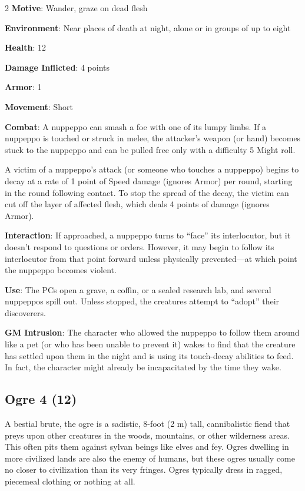 \begin{multicols}{2}
\textbf{Motive}: Wander, graze on dead flesh

\textbf{Environment}: Near places of death at night, alone or in groups of up to eight 

\textbf{Health}: 12

\textbf{Damage Inflicted}: 4 points

\textbf{Armor}: 1

\textbf{Movement}: Short

\textbf{Combat}: A nuppeppo can smash a foe with one of its lumpy limbs. If a nuppeppo is touched or struck in melee, the attacker’s weapon (or hand) becomes stuck to the nuppeppo and can be pulled free only with a difficulty 5 Might roll.

A victim of a nuppeppo’s attack (or someone who touches a nuppeppo) begins to decay at a rate of 1 point of Speed damage (ignores Armor) per round, starting in the round following contact. To stop the spread of the decay, the victim can cut off the layer of affected flesh, which deals 4 points of damage (ignores Armor).

\textbf{Interaction}: If approached, a nuppeppo turns to “face” its interlocutor, but it doesn’t respond to questions or orders. However, it may begin to follow its interlocutor from that point forward unless physically prevented—at which point the nuppeppo becomes violent.

\textbf{Use}: The PCs open a grave, a coffin, or a sealed research lab, and several nuppeppos spill out. Unless stopped, the creatures attempt to “adopt” their discoverers.

\textbf{GM Intrusion}: The character who allowed the nuppeppo to follow them around like a pet (or who has been unable to prevent it) wakes to find that the creature has settled upon them in the night and is using its touch-decay abilities to feed. In fact, the character might already be incapacitated by the time they wake.

\subsection{Ogre	4 (12)}

A bestial brute, the ogre is a sadistic, 8-foot (2 m) tall, cannibalistic fiend that preys upon other creatures in the woods, mountains, or other wilderness areas. This often pits them against sylvan beings like elves and fey. Ogres dwelling in more civilized lands are also the enemy of humans, but these ogres usually come no closer to civilization than its very fringes.
Ogres typically dress in ragged, piecemeal clothing or nothing at all.


\end{multicols}
